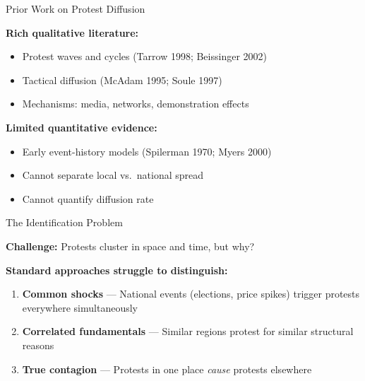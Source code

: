 \documentclass[aspectratio=169]{beamer}
\begin{document}
\begin{frame}{Prior Work on Protest Diffusion}

\textbf{Rich qualitative literature:}
\begin{itemize}
    \item Protest waves and cycles (Tarrow 1998; Beissinger 2002)
    \item Tactical diffusion (McAdam 1995; Soule 1997)
    \item Mechanisms: media, networks, demonstration effects
\end{itemize}

\vspace{0.8em}

\textbf{Limited quantitative evidence:}
\begin{itemize}
    \item Early event-history models (Spilerman 1970; Myers 2000)
    \item Cannot separate local vs.\ national spread
    \item Cannot quantify diffusion rate
\end{itemize}

\end{frame}

\begin{frame}{The Identification Problem}

\textbf{Challenge:} Protests cluster in space and time, but why?

\vspace{1.5em}

\textbf{Standard approaches struggle to distinguish:}

\begin{enumerate}
    \item \textbf{Common shocks} --- National events (elections, price spikes) trigger protests everywhere simultaneously

    \vspace{0.5em}

    \item \textbf{Correlated fundamentals} --- Similar regions protest for similar structural reasons

    \vspace{0.5em}

    \item \textbf{True contagion} --- Protests in one place \textit{cause} protests elsewhere
\end{enumerate}

\end{frame}
\end{document}

